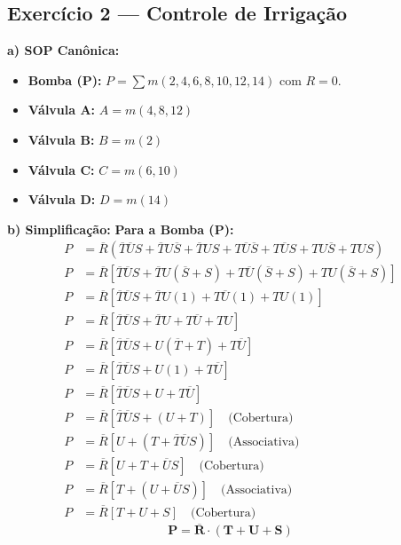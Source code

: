 \documentclass[12pt]{article}
\begin{document}
\subsection*{Exercício 2 — Controle de Irrigação}

\begin{solucao}
\textbf{a) SOP Canônica:}
\begin{itemize}
    \item \textbf{Bomba (P):} $P = \sum m(2, 4, 6, 8, 10, 12, 14)$ com $R=0$.
    \item \textbf{Válvula A:} $A = m(4, 8, 12)$
    \item \textbf{Válvula B:} $B = m(2)$
    \item \textbf{Válvula C:} $C = m(6, 10)$
    \item \textbf{Válvula D:} $D = m(14)$
\end{itemize}

\textbf{b) Simplificação:}
\textbf{Para a Bomba (P):}
\begin{align*}
    P &= \overline{R}(\overline{T}\overline{U}S + \overline{T}U\overline{S} + \overline{T}US + T\overline{U}\overline{S} + T\overline{U}S + TU\overline{S} + TUS) \\
    P &= \overline{R} [\overline{T}\overline{U}S + \overline{T}U(\overline{S} + S) + T\overline{U}(\overline{S} + S) + TU(\overline{S} + S)] \\
    P &= \overline{R} [\overline{T}\overline{U}S + \overline{T}U(1) + T\overline{U}(1) + TU(1)] \\
    P &= \overline{R} [\overline{T}\overline{U}S + \overline{T}U + T\overline{U} + TU] \\
    P &= \overline{R} [\overline{T}\overline{U}S + U(\overline{T} + T) + T\overline{U}] \\
    P &= \overline{R} [\overline{T}\overline{U}S + U(1) + T\overline{U}] \\
    P &= \overline{R} [\overline{T}\overline{U}S + U + T\overline{U}] \\
    P &= \overline{R} [\overline{T}\overline{U}S + (U + T)] \quad \text{(Cobertura)} \\
    P &= \overline{R} [U + (T + \overline{T}\overline{U}S)] \quad \text{(Associativa)} \\
    P &= \overline{R} [U + T + \overline{U}S] \quad \text{(Cobertura)} \\
    P &= \overline{R} [T + (U + \overline{U}S)] \quad \text{(Associativa)} \\
    P &= \overline{R} [T + U + S] \quad \text{(Cobertura)}
\end{align*}
\[ \mathbf{P = \overline{R} \cdot (T + U + S)} \]


\end{solucao}
\end{document}
